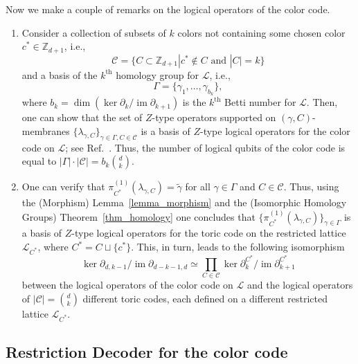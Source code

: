 \documentclass[onecolumn,letterpaper,11pt,accepted=2022-12-19]{quantumarticle}
\DeclareMathOperator{\im}{im}
\newcommand{\bnd}[2]{\partial_{#1,#2}}
\theoremstyle{definition}
\theoremstyle{lemma}
\theoremstyle{theorem}
\theoremstyle{corollary}
\begin{document}
{Now we make a couple of remarks on the logical operators of the color code.
\begin{enumerate}
\item[(i)] Consider a collection of subsets of $k$ colors not containing some chosen color $c^* \in \mathbb{Z}_{d+1}$, i.e.,
\begin{equation}
\label{eq_basis_color}
\mathcal{C} = \{ C\subset\mathbb{Z}_{d+1} | c^* \not\in C \textrm{ and }|C|=k\}
\end{equation}
and a basis of the $k^{\textrm{th}}$ homology group for $\mathcal{L}$, i.e.,
\begin{equation}
\label{eq_basis_cycle}
\Gamma = \{ \gamma_1,\ldots,\gamma_{b_k} \},
\end{equation}
where $b_k = \dim(\ker\partial_k /\im\partial_{k+1})$ is the $k^{\textrm{th}}$ Betti number for $\mathcal{L}$.
Then, one can show that the set of $Z$-type operators supported on $(\gamma,C)$-membranes
$\{ \lambda_{\gamma,C}\} _{\gamma\in \Gamma, C\in\mathcal{C}}$
is a basis of $Z$-type logical operators for the color code on $\mathcal{L}$; see Ref.~\cite{Bombin2007}.
Thus, the number of logical qubits of the color code is equal to $|\Gamma| \cdot |\mathcal{C}| = b_k {d\choose k} $.
\item[(ii)] One can verify that $\pi_{C^*}^{(1)}(\lambda_{\gamma,C}) = \widetilde\gamma$ for all $\gamma\in\Gamma$ and $C\in\mathcal{C}$.
Thus, using the (Morphism) Lemma~\ref{lemma_morphism} and the (Isomorphic Homology Groups) Theorem~\ref{thm_homology} one concludes that $\{ \pi_{C^*}^{(1)}(\lambda_{\gamma,C}) \}_{\gamma\in\Gamma}$ is a basis of $Z$-type logical operators for the toric code on the restricted lattice $\mathcal{L}_{C^*}$, where $C^* = C \sqcup \{ c^* \}$.
This, in turn, leads to the following isomorphism
\begin{equation}
\label{eq_logical_isomorphism}
\ker\bnd d {k-1} / \im \bnd {d-k-1} d \simeq \prod_{C\in\mathcal{C}} \ker\partial_k^{C^*} / \im\partial_{k+1}^{C^*}
\end{equation}
between the logical operators of the color code on $\mathcal{L}$ and the logical operators of $|\mathcal{C}| = {d \choose k}$ different toric codes, each defined on a different restricted lattice $\mathcal{L}_{C^*}$.
\end{enumerate}



\subsection{Restriction Decoder for the color code}
\label{sec_restriction_decoder}

}
\end{document}
